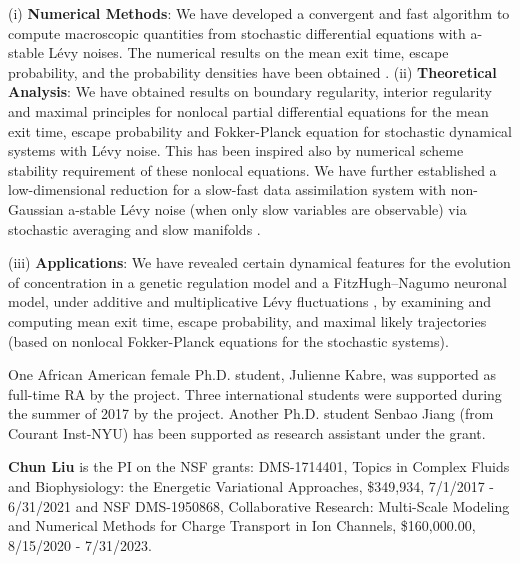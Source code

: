 \documentclass[11pt]{NSFamsart}
\begin{document}
 
(i)  \textbf{Numerical Methods}:
    We have developed a convergent and fast algorithm to compute macroscopic quantities from stochastic differential equations  with a-stable L\'evy noises. The numerical results on the mean   exit time, escape probability,  and the probability densities have been obtained \cite{ChenXL2020, GaoTing2016, Gao2016,     Wang2018NumericalAF}.
\noindent
(ii)  \textbf{Theoretical Analysis}:
We have obtained results on  boundary regularity, interior regularity and maximal principles for   nonlocal partial differential equations for the mean   exit time,   escape probability and Fokker-Planck equation for stochastic dynamical systems with L\'evy noise. This has been inspired also by numerical scheme stability requirement of these nonlocal equations. We have further established a  low-dimensional reduction for a slow-fast data assimilation system with non-Gaussian a-stable L\'evy noise (when only slow variables are observable) via stochastic averaging and slow manifolds \cite{Lv2016OnAS,QiaoDuan2018,   ZhangZhuanDuan,ZhengDuan2017,ZhengYY2020}.

\noindent
(iii)   \textbf{Applications}:
   We have revealed certain  dynamical features  for  the evolution of concentration in a genetic regulation model \cite{ChenWu} and a
   FitzHugh–Nagumo   neuronal model,   under additive and multiplicative     L\'evy fluctuations \cite{Liu2019LvyNI}, by examining and computing mean exit time, escape probability, and maximal likely trajectories (based on nonlocal Fokker-Planck equations for the stochastic systems).


 One African American female Ph.D. student, Julienne Kabre, was supported as full-time RA by the project. Three international students were supported during the summer of 2017 by the project.    Another Ph.D. student Senbao Jiang (from Courant Inst-NYU)  has been supported as research assistant under the grant. 
 
 
  



 \medskip 

\noindent\textbf{Chun Liu} is the PI on the NSF grants: DMS-1714401,  Topics in Complex Fluids and Biophysiology: the Energetic Variational Approaches, \$349,934, 7/1/2017 - 6/31/2021 and 
{NSF DMS-1950868, Collaborative Research: Multi-Scale Modeling and Numerical Methods for Charge Transport in Ion Channels, \$160,000.00, 8/15/2020 - 7/31/2023.}
\end{document}
